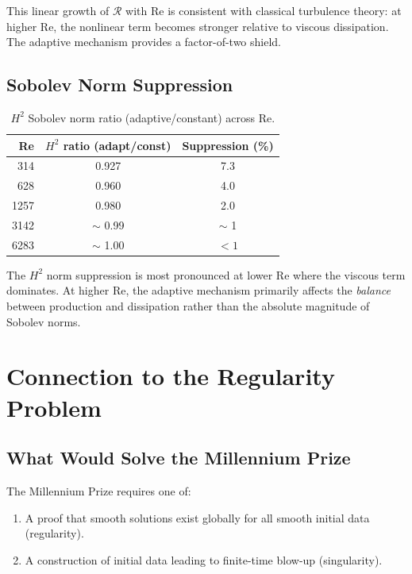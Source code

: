 \documentclass[12pt, a4paper]{article}
\begin{document}
This linear growth of $\mathcal{R}$ with Re is consistent with
classical turbulence theory: at higher Re, the nonlinear term
becomes stronger relative to viscous dissipation.
The adaptive mechanism provides a factor-of-two shield.

\subsection{Sobolev Norm Suppression}

\begin{table}[H]
\centering
\caption{$H^2$ Sobolev norm ratio (adaptive/constant) across Re.}
\label{tab:sobolev}
\begin{tabular}{@{}rcc@{}}
\toprule
Re & $H^2$ ratio (adapt/const) & Suppression (\%) \\
\midrule
314   & 0.927 & 7.3 \\
628   & 0.960 & 4.0 \\
1257  & 0.980 & 2.0 \\
3142  & $\sim$ 0.99 & $\sim$ 1 \\
6283  & $\sim$ 1.00 & $< 1$ \\
\bottomrule
\end{tabular}
\end{table}

The $H^2$ norm suppression is most pronounced at lower Re where the
viscous term dominates. At higher Re, the adaptive mechanism primarily
affects the \emph{balance} between production and dissipation rather
than the absolute magnitude of Sobolev norms.


\section{Connection to the Regularity Problem}\label{sec:connection}

\subsection{What Would Solve the Millennium Prize}

The Millennium Prize requires one of:
\begin{enumerate}[label=(\alph*)]
\item A proof that smooth solutions exist globally for all smooth
  initial data (regularity).
\item A construction of initial data leading to finite-time
  blow-up (singularity).
\end{enumerate}
\end{document}
